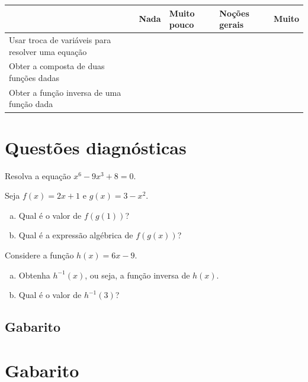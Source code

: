 \documentclass[main.tex]{subfiles}
\begin{document}
\begin{center}
 \begin{tabular}{|p{25mm}||p{10mm}|p{10mm}|p{10mm}|p{10mm}|} 
 \hline
   & Nada & Muito pouco & Noções gerais & Muito\\
 \hline
 Usar troca de variáveis para resolver uma equação &  &  &  &  \\ 
 \hline
 Obter a composta de duas funções dadas &  &  &  &  \\
 \hline
 Obter a função inversa de uma função dada &  &  &  &  \\
 \hline
\end{tabular}
\end{center}

\paraAmbos

\section{Questões diagnósticas}

\begin{diagnostico}
Resolva a equação $x^6-9x^3+8=0$.
\end{diagnostico}

\begin{diagnostico}
Seja $f(x)=2x+1$ e $g(x)=3-x^2$.
\begin{enumerate}[a)]
  \item Qual é o valor de $f(g(1))$?
  \item Qual é a expressão algébrica de $f(g(x))$?
\end{enumerate}
\end{diagnostico}

\begin{diagnostico}
Considere a função $h(x)=6x-9$.
\begin{enumerate}[a)]
  \item Obtenha $h^{-1}(x)$, ou seja, a função inversa de $h(x)$.
  \item Qual é o valor de $h^{-1}(3)$?
\end{enumerate}
\end{diagnostico}

\paraTutores
\subsection{Gabarito}

\section{Gabarito}
\end{document}
